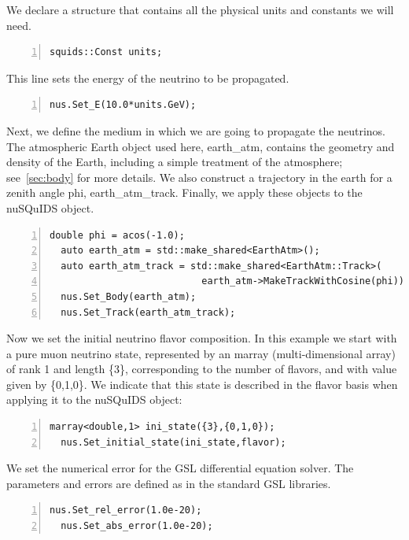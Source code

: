 \documentclass[3p,12pt]{elsarticle}
\newcommand{\ttf}{\ttfamily}
\begin{document}
We declare a structure that contains all the physical units and
constants we will need. 
\begin{lstlisting}[frame=leftline, numbers = left,breaklines=true, label = ex:sin1,firstnumber=last]
  squids::Const units;
\end{lstlisting}

This line sets the energy of the neutrino to be propagated.
\begin{lstlisting}[frame=leftline, numbers = left,breaklines=true, label = ex:sin1,firstnumber=last]
  nus.Set_E(10.0*units.GeV);
\end{lstlisting}

Next, we define the medium in which we are going to propagate the neutrinos. 
The atmospheric Earth object used here, {\ttf earth\_atm}, contains the
geometry and density of the Earth, including a simple treatment of the atmosphere; see~\ref{sec:body} for more details. We also construct a trajectory in the
earth for a zenith angle {\ttf phi}, {\ttf earth\_atm\_track}. Finally,
we apply these objects to the nuSQuIDS object.

\begin{lstlisting}[frame=leftline, numbers = left,breaklines=true, label = ex:sin1,firstnumber=last]
  double phi = acos(-1.0);
  auto earth_atm = std::make_shared<EarthAtm>();
  auto earth_atm_track = std::make_shared<EarthAtm::Track>(
                           earth_atm->MakeTrackWithCosine(phi));
  nus.Set_Body(earth_atm);
  nus.Set_Track(earth_atm_track);
\end{lstlisting}

Now we set the initial neutrino flavor composition. In this example we start with
a pure muon neutrino state, represented by an {\ttf marray} (multi-dimensional array) of rank 1 and length {\ttf
  \{3\}}, corresponding to the number of flavors, and with value given
by {\ttf\{0,1,0\}}.
We indicate that this state is described in the flavor basis when applying it to the {\ttf nuSQuIDS} object:

\begin{lstlisting}[frame=leftline, numbers = left,breaklines=true, label = ex:sin1,firstnumber=last]
  marray<double,1> ini_state({3},{0,1,0});
  nus.Set_initial_state(ini_state,flavor);
\end{lstlisting}

We set the numerical error for the GSL differential equation solver.
The parameters and errors are defined as in the standard GSL libraries.

\begin{lstlisting}[frame=leftline, numbers = left,breaklines=true, label = ex:sin1,firstnumber=last]
  nus.Set_rel_error(1.0e-20);
  nus.Set_abs_error(1.0e-20);
\end{lstlisting}
\end{document}
